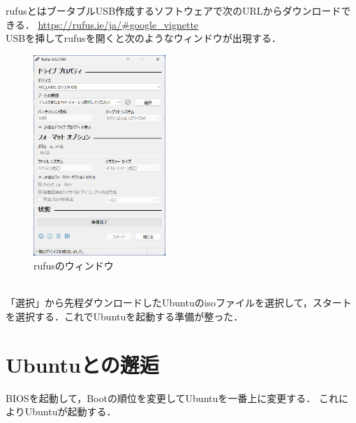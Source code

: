 \documentclass[dvipdfmx,a4paper,11pt]{jsbook}
\begin{document}
rufusとはブータブルUSB作成するソフトウェアで次のURLからダウンロードできる．
\url{https://rufus.ie/ja/#google_vignette}\\
USBを挿してrufusを開くと次のようなウィンドウが出現する．
\begin{figure}[htbp]
  \begin{center}
    \includegraphics[width = 50mm]{rufus.png}
    \caption{rufusのウィンドウ}
  \end{center}
\end{figure}
\\
「選択」から先程ダウンロードしたUbuntuのisoファイルを選択して，スタートを選択する．これでUbuntuを起動する準備が整った．

\section{Ubuntuとの邂逅}
BIOSを起動して，Bootの順位を変更してUbuntuを一番上に変更する．
これによりUbuntuが起動する．
\end{document}
